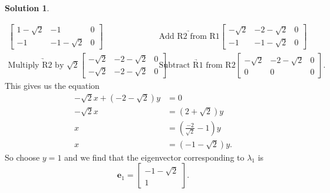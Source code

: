\documentclass[12pt]{report} %
\theoremstyle{definition}
\newtheorem{solution}{Solution}
\begin{document}
\begin{solution}
\begin{enumerate}[(a)]
\begin{align*}
    \left[
    \begin{array}{cc|c}
        1-\sqrt{2} & -1 & 0  \\
        -1 & -1 -\sqrt{2} & 0 
    \end{array}\right]
    &\underrightarrow{\textrm{Add R2 from R1}}    
    \left[
    \begin{array}{cc|c}
        -\sqrt{2} & -2-\sqrt{2} & 0  \\
        -1 & -1 -\sqrt{2} & 0 
    \end{array}\right]\\
    \underrightarrow{\textrm{Multiply R2 by $\sqrt{2}$}} 
    \left[
    \begin{array}{cc|c}
        -\sqrt{2} & -2-\sqrt{2} & 0  \\
        -\sqrt{2} & -2 -\sqrt{2} & 0 
    \end{array}\right]&\underrightarrow{\textrm{Subtract R1 from R2}}    
    \left[
    \begin{array}{cc|c}
        -\sqrt{2} & -2-\sqrt{2} & 0  \\
        0 & 0 & 0 
    \end{array}\right].
    \end{align*}
    This gives us the equation
    \begin{align*}
        -\sqrt{2}x+(-2-\sqrt{2})y&=0\\
        -\sqrt{2}x&=(2+\sqrt{2})y\\
        x&=\left(\frac{-2}{\sqrt{2}}-1\right)y\\
        x&= (-1-\sqrt{2})y.
    \end{align*}
    So choose $y=1$ and we find that the eigenvector corresponding to $\lambda_1$ is
    \[
    \mathbf{e}_1 = \begin{bmatrix} -1-\sqrt{2} \\ 1\end{bmatrix}.
    \]
    

\end{enumerate}
\end{solution}
\end{document}
